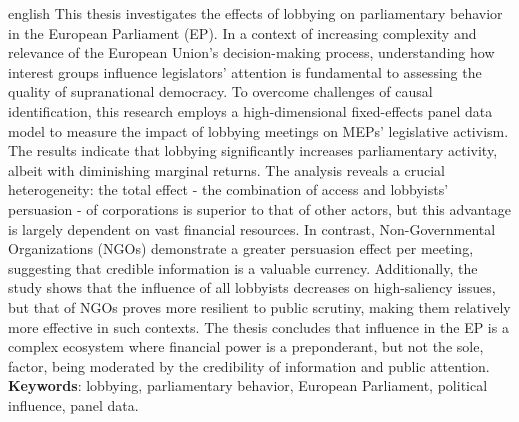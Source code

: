 \documentclass[12pt, a4paper, oneside, chapter=TITLE, subsection=TITLE, section=TITLE, subsubsection=TITLE, subsubsubsection=TITLE, english, german, brazil, hidelinks]{abntex2}
\begin{document}
    \begin{resumo}[Abstract]
        \begin{otherlanguage*}{english}
            This thesis investigates the effects of lobbying on parliamentary behavior in the European Parliament (EP). In a context of increasing complexity and relevance of the European Union's decision-making process, understanding how interest groups influence legislators' attention is fundamental to assessing the quality of supranational democracy. To overcome challenges of causal identification, this research employs a high-dimensional fixed-effects panel data model to measure the impact of lobbying meetings on MEPs' legislative activism. The results indicate that lobbying significantly increases parliamentary activity, albeit with diminishing marginal returns. The analysis reveals a crucial heterogeneity: the total effect - the combination of access and lobbyists' persuasion - of corporations is superior to that of other actors, but this advantage is largely dependent on vast financial resources. In contrast, Non-Governmental Organizations (NGOs) demonstrate a greater persuasion effect per meeting, suggesting that credible information is a valuable currency. Additionally, the study shows that the influence of all lobbyists decreases on high-saliency issues, but that of NGOs proves more resilient to public scrutiny, making them relatively more effective in such contexts. The thesis concludes that influence in the EP is a complex ecosystem where financial power is a preponderant, but not the sole, factor, being moderated by the credibility of information and public attention. \\
            \noindent
            \textbf{Keywords}: lobbying, parliamentary behavior, European Parliament, political influence, panel data.
        \end{otherlanguage*}
    \end{resumo}
    
    \listoffigures*
    \listoftables*
    \printglossary[type=\acronymtype, title={Lista de Abreviaturas e Siglas}]

    \cleardoublepage
    \tableofcontents*

    \textual %
    \setlength{\parskip}{6pt}
        
        
        
        
        
        
        
    
    \postextual %
    
    
\end{document}
